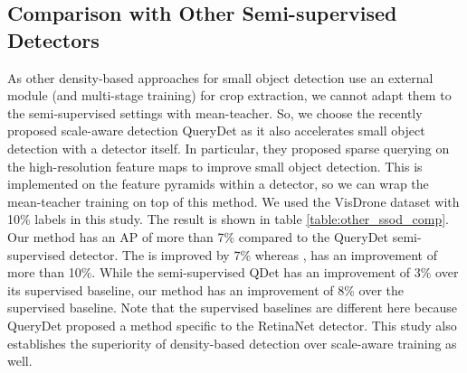 \subsection{Comparison with Other Semi-supervised Detectors}
As other density-based approaches for small object detection use an external module (and multi-stage training) for crop extraction, we cannot adapt them to the semi-supervised settings with mean-teacher. So, we choose the recently proposed scale-aware detection QueryDet \cite{querydet-Yang-2022} as it also accelerates small object detection with a detector itself. In particular, they proposed sparse querying on the high-resolution feature maps to improve small object detection. This is implemented on the feature pyramids within a detector, so we can wrap the mean-teacher training on top of this method. We used the VisDrone dataset with 10\% labels in this study. The result is shown in table \ref{table:other_ssod_comp}. Our method has an AP of more than 7\% compared to the QueryDet semi-supervised detector. The  is improved by 7\% whereas ,  has an improvement of more than 10\%. While the semi-supervised QDet has an improvement of 3\% over its supervised baseline, our method has an improvement of 8\% over the supervised baseline. Note that the supervised baselines are different here because QueryDet proposed a method specific to the RetinaNet \cite{retinanet-Lin-2017} detector. This study also establishes the superiority of density-based detection over scale-aware training as well. 

\begin{table}
    \caption{Performance comparison with QueryDet \cite{querydet-Yang-2022} method for small object detection in the semi-supervised settings using 10\% labeled images on the VisDrone dataset.}
    \centering
    \label{table:other_ssod_comp}
\end{table}

